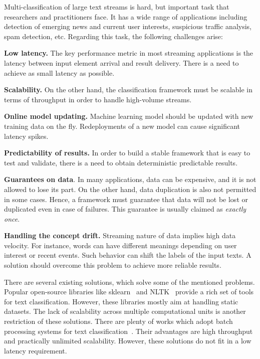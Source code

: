 \label {fs-short-intro}

Multi-classification of large text streams is hard, but important task that researchers and practitioners face. It has a wide range of applications including detection of emerging news and current user interests, suspicious traffic analysis, spam detection, etc. Regarding this task, the following challenges arise:

\textbf{Low latency.} The key performance metric in most streaming applications is the latency between input element arrival and result delivery. There is a need to achieve as small latency as possible.

\textbf{Scalability.} On the other hand, the classification framework must be scalable in terms of throughput in order to handle high-volume streams.

\textbf{Online model updating.} Machine learning model should be updated with new training data on the fly. Redeployments of a new model can cause significant latency spikes.

\textbf{Predictability of results.} In order to build a stable framework that is easy to test and validate, there is a need to obtain deterministic predictable results. 

\textbf{Guarantees on data}. In many applications, data can be expensive, and it is not allowed to lose its part. On the other hand, data duplication is also not permitted in some cases. Hence, a framework must guarantee that data will not be lost or duplicated even in case of failures. This guarantee is usually claimed as {\em exactly once}.

\textbf{Handling the concept drift.} Streaming nature of data implies high data velocity. For instance, words can have different meanings depending on user interest or recent events. Such behavior can shift the labels of the input texts. A solution should overcome this problem to achieve more reliable results.

There are several existing solutions, which solve some of the mentioned problems. Popular open-source libraries like sklearn~\cite{sklearn_api} and NLTK~\cite{bird2009natural} provide a rich set of tools for text classification. However, these libraries mostly aim at handling static datasets. The lack of scalability across multiple computational units is another restriction of these solutions. There are plenty of works which adopt batch processing systems for text classification~\cite{semberecki2016distributed, svyatkovskiy2016large, baltas2016apache, Nodarakis2016LargeSS}. Their advantages are high throughput and practically unlimited scalability. However, these solutions do not fit in a low latency requirement.


